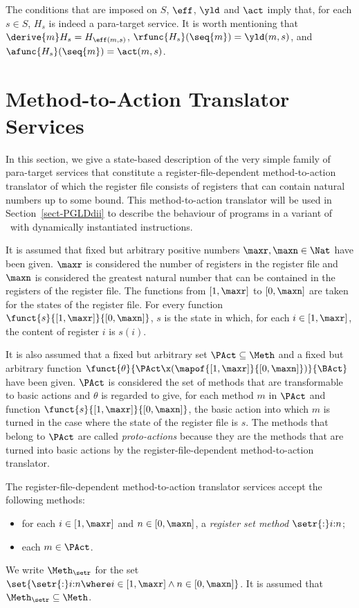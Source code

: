 \documentclass[fleqn]{llncs}
\begin{document}
The conditions that are imposed on $S$, $\eff$, $\yld$ and $\act$ imply
that, for each $s \in S$, $H_s$ is indeed a para-target service.
It is worth mentioning that $\derive{m} H_s = H_{\eff(m,s)}$,
$\rfunc{H_s}(\seq{m}) = \yld(m,s)$, and
$\afunc{H_s}(\seq{m}) = \act(m,s)$.

\section{Method-to-Action Translator Services}
\label{sect-meth-act-trl}

In this section, we give a state-based description of the very simple
family of para-target services that constitute a register-file-dependent
method-to-action translator of which the register file consists of
registers that can contain natural numbers up to some bound.
This method-to-action translator will be used in
Section~\ref{sect-PGLDdii} to describe the behaviour of programs in a
variant of \PGLD\ with dynamically instantiated instructions.

It is assumed that fixed but arbitrary positive numbers
$\maxr,\maxn \in \Nat$ have been given.
$\maxr$ is considered the number of registers in the register file and
$\maxn$ is considered the greatest natural number that can be contained
in the registers of the register file.
The functions from $[1,\maxr]$ to $[0,\maxn]$ are taken for the states
of the register file.
For every function $\funct{s}{[1,\maxr]}{[0,\maxn]}$, $s$ is the state
in which, for each $i \in [1,\maxr]$, the content of register $i$ is
$s(i)$.

It is also assumed that a fixed but arbitrary set
$\PAct \subseteq \Meth$ and a fixed but arbitrary function
$\funct{\theta}{\PAct \x (\mapof{[1,\maxr]}{[0,\maxn]})}{\BAct}$ have
been given.
$\PAct$ is considered the set of methods that are transformable to basic
actions and $\theta$ is regarded to give, for each method $m$ in $\PAct$
and function $\funct{s}{[1,\maxr]}{[0,\maxn]}$, the basic action into
which $m$ is turned in the case where the state of the register file is
$s$.
The methods that belong to $\PAct$ are called \emph{proto-actions}
because they are the methods that are turned into basic actions by the
register-file-dependent method-to-action translator.

The register-file-dependent method-to-action translator services accept
the following methods:
\begin{itemize}
\item
for each $i \in [1,\maxr]$ and $n \in [0,\maxn]$,
a \emph{register set method} $\setr{:}i{:}n$;
\item
each $m \in \PAct$.
\end{itemize}
We write $\Meth_\setr$ for the set
$\set{\setr{:}i{:}n \where i \in [1,\maxr] \land n \in [0,\maxn]}$.
It is assumed that $\Meth_\setr \subseteq \Meth$.
\end{document}
